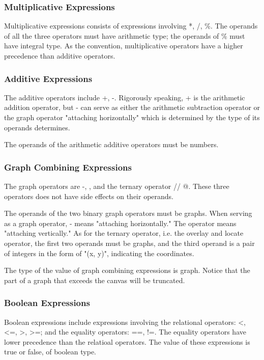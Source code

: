 \documentclass[11pt,letterpaper]{article}
\begin{document}
\subsubsection {Multiplicative Expressions}
Multiplicative expressions consists of expressions involving *, /, \%. The operands of all the three operators must have arithmetic type; the operands of \% must have integral type. As the convention, multiplicative operators have a higher precedence than additive operators. 

\subsubsection {Additive Expressions}
The additive operators include +, -. Rigorously speaking,  + is the arithmetic addition operator, but - can serve as either the arithmetic subtraction operator or the graph operator "attaching horizontally" which is determined by the type of its operands determines.

The operands of the arithmetic additive operators must be numbers.

\subsubsection {Graph Combining Expressions}
The graph operators are -, \textbar, and the ternary operator // @. These three operators does not have side effects on their operands.

The operands of the two binary graph operators must be graphs. When serving as a graph operator, - means "attaching horizontally." The operator \textbar means "attaching vertically." As for the ternary operator, i.e. the overlay and locate operator, the first two operands must be graphs, and the third operand is a pair of integers in the form of "(x, y)", indicating the coordinates.

The type of the value of graph combining expressions is graph. Notice that the part of a graph that exceeds the canvas will be truncated.

\subsubsection {Boolean Expressions}
Boolean expressions include expressions involving the relational operators:  \textless,  \textless=,  \textgreater,  \textgreater=;  and the equality operators: ==, !=. The equality operators have lower precedence than the relatioal operators. The value of these expressions is true or false, of boolean type.
\end{document}
